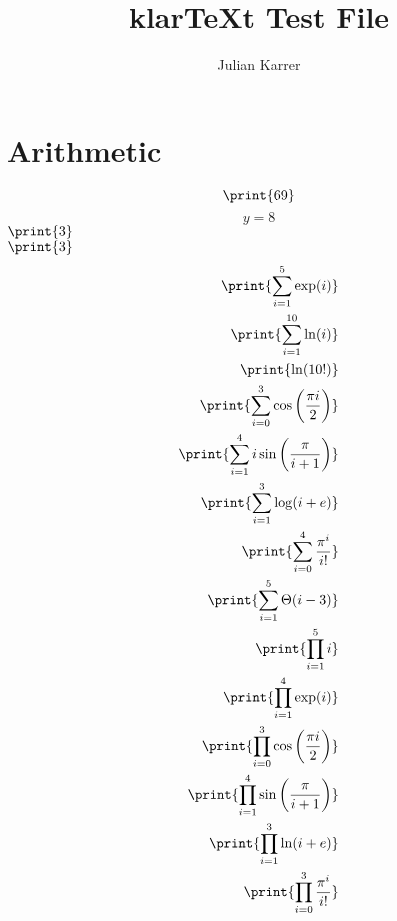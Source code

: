 \documentclass[oneside, a4paper]{article}
\author{Julian Karrer}
\title{klarTeXt Test File}
\begin{document}
\maketitle
\section*{Arithmetic}

\begin{program}


\begin{equation*}
    \print{69}
\end{equation*}
\begin{displaymath} y=8 \end{displaymath}
\(\print{3}\)\\
\begin{math}\print{3}\end{math}
\begin{align*}
    \print{\sum_{i=1}^5 \exp(i)}\\
    \print{\sum_{i=1}^{10} \ln(i)}\\
    \print{\ln(10!)}\\
    \print{\sum_{i=0}^{3}\cos\left(\frac{\pi i}{2}\right)}\\
    \print{\sum_{i=1}^{4} i\sin\left(\frac{\pi}{i+1}\right)}\\
    \print{\sum_{i=1}^{3} \log(i+e)}\\
    \print{\sum_{i=0}^{4} \frac{\pi^i}{i!}}\\
    \print{\sum_{i=1}^{5} \Theta(i-3)}\\
    \print{\prod_{i=1}^{5} i}\\
    \print{\prod_{i=1}^4 \exp(i)}\\
    \print{\prod_{i=0}^{3}\cos\left(\frac{\pi i}{2}\right)}\\
    \print{\prod_{i=1}^{4} \sin\left(\frac{\pi}{i+1}\right)}\\
    \print{\prod_{i=1}^{3} \ln(i+e)}\\
    \print{\prod_{i=0}^{3} \frac{\pi^i}{i!}}
\end{align*}





\end{program}
\end{document}
